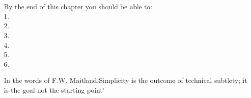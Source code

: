 \documentclass[7pt]{article}
\begin{document}
\newpage


 \begin{titlepage}
	\vspace*{\fill}
	\begin{center}
			\\[0.5cm]
	\end{center}
	\vspace*{\fill}
\end{titlepage}

 \begin{titlepage}
	\vspace*{\fill}
	\begin{center}
		\\
	\end{center}
	By the end of this chapter you should be able to:\\
1. \\
2. \\
3. \\
4. \\
5. \\
6. \\
	\vspace*{\fill}
\end{titlepage}

\newpage

\vspace{15.0in}

In the words of F.W. Maitland,Simplicity is the outcome of technical subtlety; it is the goal not the starting point'


\newpage


\vspace{0.073in}
\end{document}
